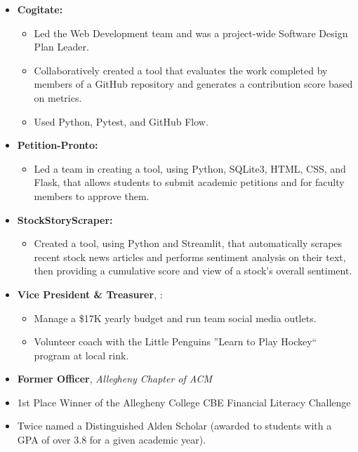 



\begin{itemize}
\item \textbf{Cogitate:}
\begin{itemize}
    \item Led the Web Development team and was a project-wide Software Design Plan Leader.
    \item Collaboratively created a tool that evaluates the work completed by members of a GitHub repository and generates a contribution score based on metrics.
    \item Used Python, Pytest, and GitHub Flow.
\end{itemize}

\item \textbf{Petition-Pronto:}
\begin{itemize}
    \item Led a team in creating a tool, using Python, SQLite3, HTML, CSS, and Flask, that allows students to submit academic petitions and for faculty members to approve them.
\end{itemize}

\item \textbf{StockStoryScraper:}
\begin{itemize}
    \item Created a tool, using Python and Streamlit, that automatically scrapes recent stock news articles and performs sentiment analysis on their text, then providing a cumulative score and view of a stock's overall sentiment.
\end{itemize}
\end{itemize}




\begin{itemize}
\item \textbf{Vice President \& Treasurer}, :

\begin{itemize}
    \item Manage a \$17K yearly budget and run team social media outlets.
    \item Volunteer coach with the Little Penguins ''Learn to Play Hockey`` program at local rink.
\end{itemize}

\item \textbf{Former Officer}, \textit{Allegheny Chapter of ACM}
\end{itemize}



\begin{itemize}
\item 1st Place Winner of the Allegheny College CBE Financial Literacy Challenge
\item Twice named a Distinguished Alden Scholar (awarded to students with a GPA of over 3.8 for a given academic year).
\end{itemize}




